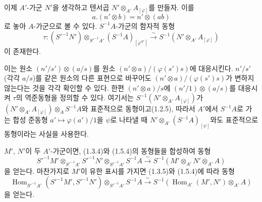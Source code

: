 \begin{env}[1.5.4]
\label{0.1.5.4-ko}
이제 $A'$-가군 $N'$을 생각하고 텐서곱 $N'\otimes_{A'}A_{[\varphi]}$를 만들자. 이를
\[
  a.(n'\otimes b)=n'\otimes(ab)
\]
로 놓아 $A$-가군으로 볼 수 있다.
$S^{-1}A$-가군의 함자적 동형
\[
  \tau:(S'^{-1}N')\otimes_{S'^{-1}A'}(S^{-1}A)_{[\varphi^{S'}]}
  \xrightarrow{\sim}
  S^{-1}(N'\otimes_{A'}A_{[\varphi]})
\]
이 존재한다.

이는 원소 $(n'/s')\otimes(a/s)$를 원소 $(n'\otimes a)/(\varphi(s')s)$에 대응시킨다. $n'/s'$(각각 $a/s$)를 같은 원소의 다른 표현으로 바꾸어도 $(n'\otimes a)/(\varphi(s')s)$가 변하지 않는다는 것을 각각 확인할 수 있다. 한편 $(n'\otimes a)/s$에 $(n'/1)\otimes(a/s)$를 대응시켜 $\tau$의 역준동형을 정의할 수 있다. 여기서는 $S^{-1}(N'\otimes_{A'}A_{[\varphi]})$가 $(N'\otimes_{A'}A_{[\varphi]})\otimes_A S^{-1}A$와 표준적으로 동형이고(1.2.5), 따라서 $A'$에서 $S^{-1}A$로 가는 합성 준동형 $a'\mapsto\varphi(a')/1$을 $\psi$로 나타낼 때 $N'\otimes_{A'}(S^{-1}A)_{[\psi]}$와도 표준적으로 동형이라는 사실을 사용한다.
\end{env}

\begin{env}[1.5.5]
\label{0.1.5.5-ko}
$M'$, $N'$이 두 $A'$-가군이면, (1.3.4)와 (1.5.4)의 동형들을 합성하여 동형
\[
  S'^{-1}M'\otimes_{S'^{-1}A'}S'^{-1}N'
  \otimes_{S'^{-1}A'}S^{-1}A
  \xrightarrow{\sim}
  S^{-1}(M'\otimes_{A'}N'\otimes_{A'}A)
\]
을 얻는다.
마찬가지로 $M'$이 유한 표시를 가지면 (1.3.5)와 (1.5.4)에 따라 동형
\[
  \operatorname{Hom}_{S'^{-1}A'}(S'^{-1}M',S'^{-1}N')
  \otimes_{S'^{-1}A'}S^{-1}A
  \xrightarrow{\sim}
  S^{-1}(\operatorname{Hom}_{A'}(M',N')\otimes_{A'}A)
\]
을 얻는다.
\end{env}

